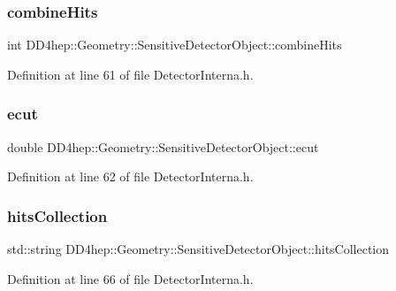 \subsubsection{\texorpdfstring{combine\+Hits}{combineHits}}
{\footnotesize\ttfamily int D\+D4hep\+::\+Geometry\+::\+Sensitive\+Detector\+Object\+::combine\+Hits}



Definition at line 61 of file Detector\+Interna.\+h.

\hypertarget{class_d_d4hep_1_1_geometry_1_1_sensitive_detector_object_a1c51c612aaac8b1ae21daf7030f0659a}{}\label{class_d_d4hep_1_1_geometry_1_1_sensitive_detector_object_a1c51c612aaac8b1ae21daf7030f0659a} 
\subsubsection{\texorpdfstring{ecut}{ecut}}
{\footnotesize\ttfamily double D\+D4hep\+::\+Geometry\+::\+Sensitive\+Detector\+Object\+::ecut}



Definition at line 62 of file Detector\+Interna.\+h.

\hypertarget{class_d_d4hep_1_1_geometry_1_1_sensitive_detector_object_abf517c287f2744812828ba3e7c12a4f1}{}\label{class_d_d4hep_1_1_geometry_1_1_sensitive_detector_object_abf517c287f2744812828ba3e7c12a4f1} 
\subsubsection{\texorpdfstring{hits\+Collection}{hitsCollection}}
{\footnotesize\ttfamily std\+::string D\+D4hep\+::\+Geometry\+::\+Sensitive\+Detector\+Object\+::hits\+Collection}



Definition at line 66 of file Detector\+Interna.\+h.

\hypertarget{class_d_d4hep_1_1_geometry_1_1_sensitive_detector_object_a46aaaef7d8eaba09dc9f7cc77c903d40}{}\label{class_d_d4hep_1_1_geometry_1_1_sensitive_detector_object_a46aaaef7d8eaba09dc9f7cc77c903d40} 
